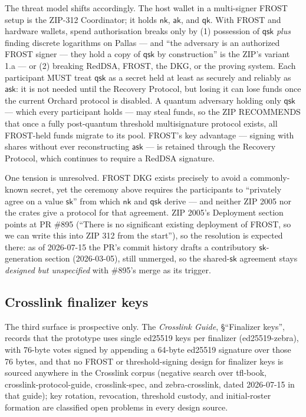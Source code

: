 \documentclass[11pt,a4paper]{article}
\theoremstyle{definition}
\newcommand{\ask}{\ensuremath{\mathsf{ask}}}
\newcommand{\aksym}{\ensuremath{\mathsf{ak}}}
\newcommand{\nksym}{\ensuremath{\mathsf{nk}}}
\begin{document}
The threat model shifts accordingly. The host wallet in a multi-signer
FROST setup is the ZIP-312 Coordinator; it holds $\nksym$, $\aksym$, and
$\mathsf{qk}$. With FROST and hardware wallets, spend authorisation breaks
only by (1) possession of $\mathsf{qsk}$ \emph{plus} finding discrete
logarithms on Pallas --- and ``the adversary is an authorized FROST
signer --- they hold a copy of $\mathsf{qsk}$ by construction'' is the
ZIP's variant 1.a --- or (2) breaking RedDSA, FROST, the DKG, or the
proving system. Each participant MUST treat $\mathsf{qsk}$ as a secret
held at least as securely and reliably as $\ask$: it is not needed until
the Recovery Protocol, but losing it can lose funds once the current
Orchard protocol is disabled. A quantum adversary holding only
$\mathsf{qsk}$ --- which every participant holds --- may steal funds, so
the ZIP RECOMMENDS that once a fully post-quantum threshold
multisignature protocol exists, all FROST-held funds migrate to its pool.
FROST's key advantage --- signing with shares without ever reconstructing
$\ask$ --- is retained through the Recovery Protocol, which continues to
require a RedDSA signature.

One tension is unresolved. FROST DKG exists precisely to avoid a
commonly-known secret, yet the ceremony above requires the participants to
``privately agree on a value $\mathsf{sk}$'' from which $\nksym$ and
$\mathsf{qsk}$ derive --- and neither ZIP 2005 nor the crates give a
protocol for that agreement. ZIP 2005's Deployment section points at
PR \#895 (``There is no significant existing deployment of FROST, so we
can write this into ZIP 312 from the start''), so the resolution is
expected there: as of 2026-07-15 the PR's commit history drafts a
contributory $\mathsf{sk}$-generation section (2026-03-05), still
unmerged, so the shared-$\mathsf{sk}$ agreement stays \emph{designed
but unspecified} with \#895's merge as its trigger.

\subsection{Crosslink finalizer keys}\label{sec:fr-deploy-crosslink}

The third surface is prospective only. The \emph{Crosslink Guide},
\S``Finalizer keys'', records that the prototype uses single ed25519 keys
per finalizer (ed25519-zebra), with 76-byte votes signed by appending a
64-byte ed25519 signature over those 76 bytes, and that no FROST or
threshold-signing design for finalizer
keys is sourced anywhere in the Crosslink corpus (negative search over
tfl-book, crosslink-protocol-guide, crosslink-spec, and zebra-crosslink,
dated 2026-07-15 in that guide); key rotation, revocation, threshold
custody, and initial-roster formation are classified open problems in
every design source.
\end{document}

